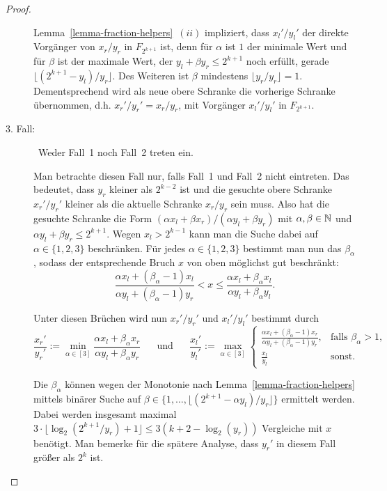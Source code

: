 \begin{proof}
\begin{description}
		Lemma~\ref{lemma-fraction-helpers}~$(ii)$ impliziert, dass $x_l'/y_l'$ der direkte Vorgänger von $x_r/y_r$ in $F_{2^{k+1}}$ ist, denn für $\alpha$ ist $1$ der minimale Wert und für $\beta$ ist der maximale Wert, der $y_l + \beta y_r \leq 2^{k+1}$ noch erfüllt, gerade $\lfloor (2^{k+1} - y_l)/y_r \rfloor$.
		Des Weiteren ist $\beta$ mindestens $\lfloor y_r/y_r  \rfloor = 1$.
		Dementsprechend wird als neue obere Schranke die vorherige Schranke übernommen, d.h. $x_r'/y_r' = x_r/y_r$, mit Vorgänger $x_l'/y_l'$ in $F_{2^{k+1}}$.
		
		\item[3. Fall:]~Weder Fall~1 noch Fall~2 treten ein.
		
			Man betrachte diesen Fall nur, falls Fall~1 und Fall~2 nicht eintreten.
			Das bedeutet, dass $y_r$ kleiner als $2^{k-2}$ ist und die gesuchte obere Schranke $x_r'/y_r'$ kleiner als die aktuelle Schranke $x_r/y_r$ sein muss.
			Also hat die gesuchte Schranke die Form $(\alpha x_l + \beta x_r)/(\alpha y_l + \beta y_r)$ mit $\alpha,\beta\in\mathbb{N}$ und $\alpha y_l + \beta y_r\leq 2^{k+1}$.
			Wegen $x_l > 2^{k-1}$ kann man die Suche dabei auf $\alpha \in \{ 1, 2, 3 \}$ beschränken.
			Für jedes $\alpha\in\{1,2,3\}$ bestimmt man nun das $\beta_\alpha$, sodass der entsprechende Bruch $x$ von oben möglichst gut beschränkt:
			\[
				\frac{\alpha x_l + (\beta_\alpha - 1) x_l}{\alpha y_l + (\beta_\alpha - 1) y_r} < x \leq \frac{\alpha x_l + \beta_\alpha x_l}{\alpha y_l + \beta_\alpha y_l}.
			\]
			
			Unter diesen Brüchen wird nun $x_r'/y_r'$ und $x_l'/y_l'$ bestimmt durch
			\[\frac{x_r'}{y_r'}:=\min_{\alpha\in[3]} \frac{\alpha x_l + \beta_\alpha x_r}{\alpha y_l + \beta_\alpha y_r}
			\text{~~~~~und~~~~~}
			\frac{x_l'}{y_l'}:=\max_{\alpha\in[3]} \begin{cases}
			\frac{\alpha x_l + (\beta_\alpha - 1)x_r}{\alpha y_l + (\beta_\alpha - 1)y_r}, &\text{falls $\beta_\alpha > 1$,}\\
			\frac{x_l}{y_l} &\text{sonst.}
			\end{cases}
		\]
			
			Die $\beta_\alpha$ können wegen der Monotonie nach Lemma~\ref{lemma-fraction-helpers} mittels binärer Suche auf $\beta \in \{1,\dots, \lfloor (2^{k+1} - \alpha y_l) / y_r \rfloor \}$ ermittelt werden.
			Dabei werden insgesamt maximal $3 \cdot \lfloor \log_2(2^{k+1} / y_r) + 1 \rfloor \leq 3 (k+2 - \log_2(y_r))$ Vergleiche mit $x$ benötigt.
			Man bemerke für die spätere Analyse, dass $y_r'$ in diesem Fall größer als $2^k$ ist.
 	\end{description}
 	

\end{proof}
